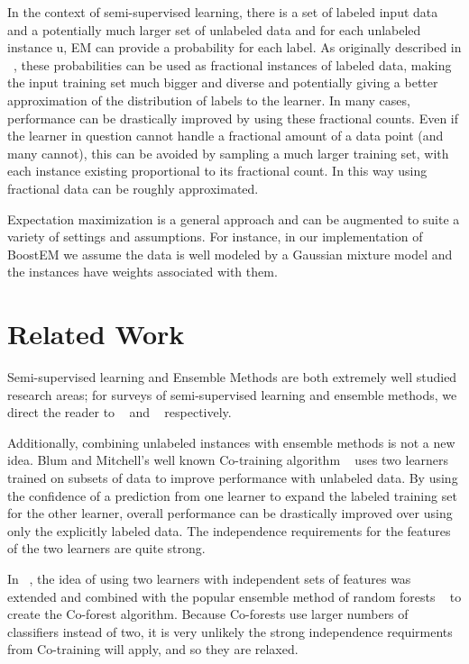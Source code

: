 \documentclass{sig-alternate}
\begin{document}
 In the context of semi-supervised learning, there is a set of labeled input data and a potentially much larger set of unlabeled data and for each unlabeled instance u, EM can provide a probability for each label.  As originally described in ~\cite{nigam2000text}, these probabilities can be used as fractional instances of labeled data, making the input training set much bigger and diverse and potentially giving a better approximation of the distribution of labels to the learner. In many cases, performance can be drastically improved by using these fractional counts. Even if the learner in question cannot handle a fractional amount of a data point (and many cannot), this can be avoided by sampling a much larger training set, with each instance existing proportional to its fractional count.  In this way using fractional data can be roughly approximated.

Expectation maximization is a general approach and can be augmented to suite a variety of settings and assumptions.  For instance, in our implementation of BoostEM we assume the data is well modeled by a Gaussian mixture model and the instances have weights associated with them.    

     
\section{Related Work}
Semi-supervised learning and Ensemble Methods are both extremely well studied research areas; for surveys of semi-supervised learning and ensemble methods, we direct the reader to ~\cite{zhu05survey} and ~\cite{dietterichl2002ensemble} respectively. 

Additionally, combining unlabeled instances with ensemble methods is not a new idea.  Blum and Mitchell's well known Co-training algorithm  ~\cite{blum1998combining} uses two learners trained on subsets of data to improve performance with unlabeled data.  By using the confidence of a prediction from one learner to expand the labeled training set for the other learner, overall performance can be drastically improved over using only the explicitly labeled data.  The independence requirements for the features of the two learners are quite strong. 

In ~\cite{li2007improve}, the idea of using two learners with independent sets of features was extended and combined with the popular ensemble method of random forests ~\cite{breiman2001random} to create the Co-forest algorithm. Because Co-forests use larger numbers of classifiers instead of two, it is very unlikely the strong independence requirments from Co-training will apply, and so they are relaxed.
\end{document}
